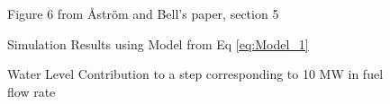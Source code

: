         \begin{figure}[ht]
            \begin{center}
                
                Figure 6 from \r{A}str\"{o}m and Bell's paper, section 5 \cite{Astrom}

                
                Simulation Results using Model from Eq \eqref{eq:Model_1}
                
                \caption{Water Level Contribution to a step corresponding to 10 MW in fuel flow rate}
                \label{fig:Fig6B}
            \end{center}
        \end{figure}  %
